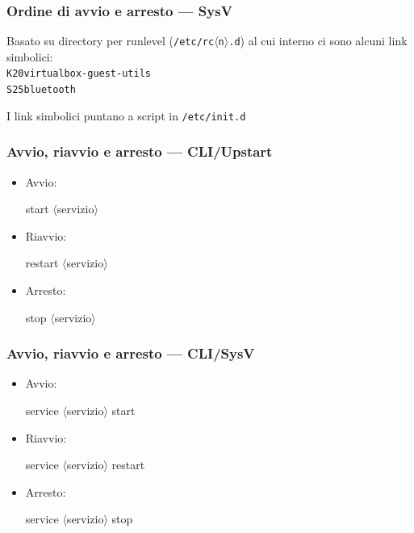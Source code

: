 \documentclass{beamer}
\newenvironment{shell*}{\par\vspace{.5em}\begin{beamercolorbox}[rounded=true,sep=.2em]{shell snippet}\ttfamily {\color{red}\#}}{\end{beamercolorbox}}
\newcommand{\param}[1]{$\langle$#1$\rangle$}
\begin{document}
\begin{frame}
  \frametitle{Ordine di avvio e arresto --- SysV}
  Basato su directory per runlevel (\texttt{/etc/rc\alert{\param{n}}.d})
  al cui interno ci sono alcuni \alert{link simbolici}:\\
  \texttt{\alert{K20}virtualbox-guest-utils}\\
  \texttt{\alert{S25}bluetooth}
  
  \medskip
  I link simbolici puntano a script in \texttt{/etc/init.d}
\end{frame}

\begin{frame}[t]
  \frametitle{Avvio, riavvio e arresto --- CLI/Upstart}
  
  \begin{itemize}[<1->]
    \item Avvio:
      \begin{shell*}
        start \alert{\param{servizio}}
      \end{shell*}
    \item Riavvio:
      \begin{shell*}
        restart \alert{\param{servizio}}
      \end{shell*}
    \item Arresto:
      \begin{shell*}
        stop \alert{\param{servizio}}
      \end{shell*}
  \end{itemize}
\end{frame}

\begin{frame}[t]
  \frametitle{Avvio, riavvio e arresto --- CLI/SysV}
  \begin{itemize}[<1->]
    \item Avvio:
      \begin{shell*}
        service \alert{\param{servizio}} start
      \end{shell*}
    \item Riavvio:
      \begin{shell*}
        service \alert{\param{servizio}} restart
      \end{shell*}
    \item Arresto:
      \begin{shell*}
        service \alert{\param{servizio}} stop
      \end{shell*}
  \end{itemize}
\end{frame}
\end{document}
